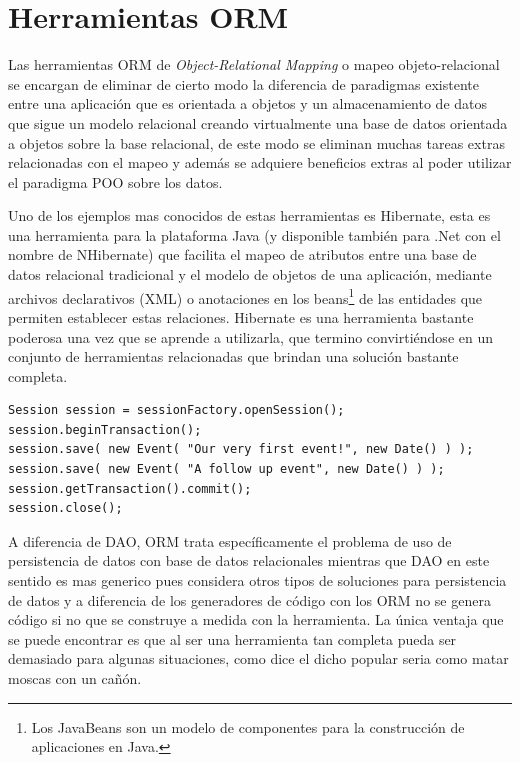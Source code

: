 \section{Herramientas ORM}
Las herramientas ORM de \textit{Object-Relational Mapping} o mapeo objeto-relacional se encargan de eliminar de cierto modo la diferencia de paradigmas existente entre una aplicación que es orientada a objetos y un almacenamiento de datos que sigue un modelo relacional creando virtualmente una base de datos orientada a objetos sobre la base relacional, de este modo se eliminan muchas tareas extras relacionadas con el mapeo y además se adquiere beneficios extras al poder utilizar el paradigma POO sobre los datos.

Uno de los ejemplos mas conocidos de estas herramientas  es Hibernate, esta es una herramienta para la plataforma Java (y disponible también para .Net con el nombre de NHibernate) que facilita el mapeo de atributos entre una base de datos relacional tradicional y el modelo de objetos de una aplicación, mediante archivos declarativos (XML) o anotaciones en los beans\footnote{Los JavaBeans son un modelo de componentes para la construcción de aplicaciones en Java.} de las entidades que permiten establecer estas relaciones. Hibernate es una herramienta bastante poderosa una vez que se aprende a utilizarla, que termino convirtiéndose en un conjunto de herramientas relacionadas que brindan una solución bastante completa.
\begin{lstlisting}[title=Minimo ejemplo de Hibernate: guardando datos en la DB]
Session session = sessionFactory.openSession();
session.beginTransaction();
session.save( new Event( "Our very first event!", new Date() ) );
session.save( new Event( "A follow up event", new Date() ) );
session.getTransaction().commit();
session.close();
\end{lstlisting}
A diferencia de DAO, ORM trata específicamente el problema de uso de persistencia de datos con base de datos relacionales mientras que DAO en este sentido es mas generico pues considera otros tipos de soluciones para persistencia de datos y a diferencia de los generadores de código con los ORM no se genera código si no que se construye a medida con la herramienta. La única ventaja que se puede encontrar es que al ser una herramienta tan completa pueda ser demasiado para algunas situaciones, como dice el dicho popular seria como matar moscas con un cañón.
%
